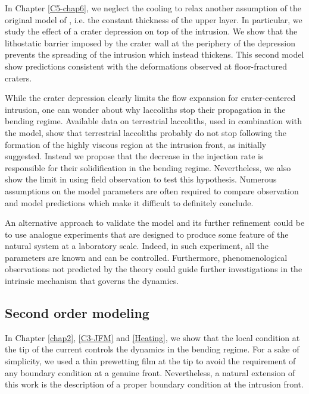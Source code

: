 In Chapter  \ref{C5-chap6}, we  neglect the  cooling to  relax another
assumption of  the original model of  \citet{Michaut:2011kg}, i.e. the
constant thickness  of the  upper layer. In  particular, we  study the
effect of a  crater depression on top of the  intrusion.  We show that
the lithostatic barrier imposed by the crater wall at the periphery of
the depression prevents  the spreading of the  intrusion which instead
thickens.   This second  model  show predictions  consistent with  the
deformations observed at floor-fractured craters.

While  the crater  depression clearly  limits the  flow expansion  for
crater-centered intrusion,  one can  wonder about why  laccoliths stop
their propagation in the bending regime. Available data on terrestrial
laccoliths, used in combination with  the model, show that terrestrial
laccoliths probably do not stop  following the formation of the highly
viscous region at the intrusion front, as initially suggested. Instead
we propose that the decrease in  the injection rate is responsible for
their  solidification in  the bending  regime.  Nevertheless,  we also
show the  limit in  using field observation  to test  this hypothesis.
Numerous assumptions  on the  model parameters  are often  required to
compare observation and  model predictions which make  it difficult to
definitely conclude.

An  alternative  approach  to  validate  the  model  and  its  further
refinement could be  to use analogue experiments that  are designed to
produce  some feature  of the  natural system  at a  laboratory scale.
Indeed, in  such experiment, all the  parameters are known and  can be
controlled.  Furthermore, phenomenological  observations not predicted
by  the theory  could guide  further investigations  in the  intrinsic
mechanism that governs the dynamics.

\subsection{Second order modeling}
\label{sec:perspectives}

In Chapter  \ref{chap2}, \ref{C3-JFM} and \ref{Heating},  we show that
the local condition at the tip of the current controls the dynamics in
the  bending  regime.  For  a  sake  of  simplicity,  we used  a  thin
prewetting film  at the tip to  avoid the requirement of  any boundary
condition at  a genuine  front. Nevertheless,  a natural  extension of
this work  is the description  of a  proper boundary condition  at the
intrusion front.

